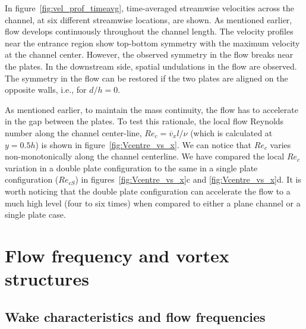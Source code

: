 \documentclass[aps,pre,twocolumn,aps,longbibliography]{revtex4-1}
\begin{document}
	
	In figure~\ref{fig:vel_prof_timeavg}, time-averaged streamwise velocities across the channel, at six different streamwise locations, are shown. As mentioned earlier, flow develops continuously throughout the channel length. The velocity profiles near the entrance region show top-bottom symmetry with the maximum velocity at the channel center. However, the observed symmetry in the flow breaks near the plates. In the downstream side, spatial undulations in the flow are observed. The symmetry in the flow can be restored if the two plates are aligned on the opposite walls, i.e., for $d/h=0$.
	
	
	As mentioned earlier, to maintain the mass continuity, the flow has to accelerate in the gap between the plates. To test this rationale, the local flow Reynolds number along the channel center-line, $Re_c=\overline{v}_xl/\nu$ (which is calculated at $y=0.5h$) is shown in figure~\ref{fig:Vcentre_vs_x}. We can notice that $Re_c$ varies non-monotonically along the channel centerline. We have compared the local $Re_c$ variation in a double plate configuration to the same in a single plate configuration ($Re_{cS}$) in figures~\ref{fig:Vcentre_vs_x}c and \ref{fig:Vcentre_vs_x}d. It is worth noticing that the double plate configuration can accelerate the flow to a much high level (four to six times) when compared to either a plane channel or a single plate case.
	
	
	\section{Flow frequency and vortex structures}
	
	\subsection{Wake characteristics and flow frequencies}
	
\end{document}
